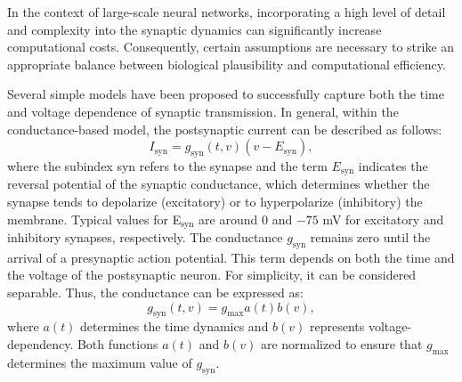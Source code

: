 \documentclass[../main.tex]{subfiles}
\begin{document}
In the context of large-scale neural networks, incorporating a high level of detail and complexity into the synaptic dynamics can significantly increase computational costs.
Consequently, certain assumptions are necessary to strike an appropriate balance between biological plausibility and computational efficiency.

Several simple models have been proposed to successfully capture both the time and voltage dependence of synaptic transmission. 
In general, within the conductance-based model, the postsynaptic current can be described as follows:
\begin{equation}
    I_{\text{syn}} = g_{\text{syn}}(t,v)(v-E_{\text{syn}}),
    \label{eq:synaptic-current}
\end{equation}
where the subindex syn refers to the synapse and the term $E_{\text{syn}}$ indicates the reversal potential of the synaptic conductance, which determines whether the synapse tends to depolarize (excitatory) or to hyperpolarize (inhibitory) the membrane.
Typical values for E$_{\text{syn}}$ are around $0$ and $-75$ mV for excitatory and inhibitory synapses, respectively. 
The conductance $g_{\text{syn}}$ remains zero until the arrival of a presynaptic action potential. 
This term depends on both the time and the voltage of the postsynaptic neuron. For simplicity, it can be considered separable.
Thus, the conductance can be expressed as:
\begin{equation}
    g_{\text{syn}}(t, v) = g_{\text{max}} a(t)b(v),
    \label{eq:synaptic-conductance}
\end{equation}
where $a(t)$ determines the time dynamics and $b(v)$ represents voltage-dependency.
Both functions $a(t)$ and $b(v)$ are normalized to ensure that $g_{\text{max}}$ determines the maximum value of $g_{\text{syn}}$.
\end{document}
